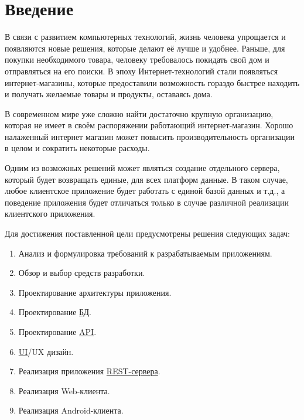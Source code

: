 \label{sec:intro}
\section*{Введение}\indent

В связи с развитием компьютерных технологий, жизнь человека упрощается и появляются новые решения, которые делают её лучше и удобнее. 
Раньше, для покупки необходимого товара, человеку требовалось покидать свой дом и отправляться на его поиски.
В эпоху Интернет-технологий стали появляться интернет-магазины, которые предоставили возможность гораздо быстрее находить и получать желаемые товары и продукты, оставаясь дома.

В современном мире уже сложно найти достаточно крупную организацию, которая не имеет в своём распоряжении работающий интернет-магазин.
Хорошо налаженный интернет магазин может повысить производительность организации в целом и сократить некоторые расходы.

Одним из возможных решений может являться создание отдельного сервера, который будет возвращать единые, для всех платформ данные. 
В таком случае, любое клиентское приложение будет работать с единой базой данных и т.д., а поведение приложения будет отличаться только в случае различной реализации клиентского приложения.

Для достижения поставленной цели предусмотрены решения следующих задач:
\begin{enumerate}
    \item Анализ и формулировка требований к разрабатываемым приложениям.
    \item Обзор и выбор средств разработки.
    \item Проектирование архитектуры приложения.
    \item Проектирование \hyperlink{gloss:db}{БД}.
    \item Проектирование \hyperlink{gloss:api}{API}.
    \item \hyperlink{gloss:ui}{UI}/UX дизайн.
    \item Реализация приложения \hyperlink{gloss:rest}{REST-сервера}.
    \item Реализация Web-клиента.
    \item Реализация Android-клиента.
\end{enumerate}